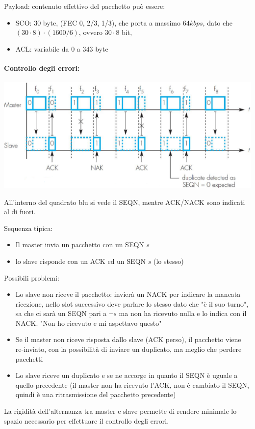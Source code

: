 Payload: contenuto effettivo del pacchetto può essere: 
\begin{itemize}
	\item SCO: 30 byte,  (FEC 0, 2/3, 1/3), che porta a massimo $64kbps$, dato che $(30 \cdot 8) \cdot (1600/6)$, ovvero $30 \cdot 8$ bit, 
	\item ACL: variabile da 0 a 343 byte
\end{itemize}

\paragraph{Controllo degli errori: }
\begin{center}
	\includegraphics[width=0.9\linewidth]{img/wpan/errorcorr1}
\end{center}

All'interno del quadrato blu si vede il SEQN, mentre ACK/NACK sono indicati al di fuori.

Sequenza tipica:
\begin{itemize}
	\item Il master invia un pacchetto con un SEQN $s$
	\item lo slave risponde con un ACK ed un SEQN $s$ (lo stesso)
\end{itemize}

Possibili problemi: 
\begin{itemize}
	\item Lo slave non riceve il pacchetto: invierà un NACK per indicare la mancata ricezione, nello slot successivo deve parlare lo stesso dato che "è il suo turno", sa che ci sarà un SEQN pari a $\neg s$ ma non ha ricevuto nulla e lo indica con il NACK. "Non ho ricevuto e mi aspettavo questo"
	\item Se il master non riceve risposta dallo slave (ACK perso), il pacchetto viene re-inviato, con la possibilità di inviare un duplicato, ma meglio che perdere pacchetti
	\item Lo slave riceve un duplicato e se ne accorge in quanto il SEQN è uguale a quello precedente (il master non ha ricevuto l'ACK, non è cambiato il SEQN, quindi è una ritrasmissione del pacchetto precedente)
\end{itemize}
La rigidità dell'alternanza tra master e slave permette di rendere minimale lo spazio necessario per effettuare il controllo degli errori.

